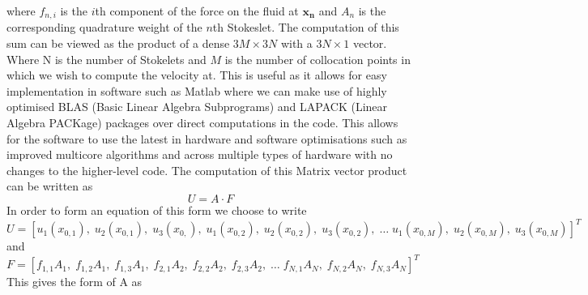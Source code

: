 where $f_{n, i}$ is the $i$th component of the force on the fluid at $\mathbf{x_n}$ and $A_n$ is the corresponding quadrature weight of the $n$th Stokeslet. The computation of this sum can be viewed as the product of a dense $3M \times 3N$ with a $3N \times 1$ vector. Where N is the number of Stokelets and $M$ is the number of collocation points in which we wish to compute the velocity at. This is useful as it allows for easy implementation in software such as Matlab where we can make use of highly optimised BLAS (Basic Linear Algebra Subprograms) and LAPACK (Linear Algebra PACKage) packages over direct computations in the code. This allows for the software to use the latest in hardware and software optimisations such as improved multicore algorithms and across multiple types of hardware with no changes to the higher-level code. 
The computation of this Matrix vector product can be written as 
\begin{equation}
\label{eq:matrixvectorproduct}
    U = A \cdot F
\end{equation}
In order to form an equation of this form we choose to write 
\small
\begin{equation*}
    U = [u_1(x_{0,1}), \; u_2(x_{0,1}), \; u_3(x_{0,}), \; u_1(x_{0,2}), \; u_2(x_{0,2}), \; u_3(x_{0,2}), \; \dots \; u_1(x_{0,M}), \; u_2(x_{0,M}), \; u_3(x_{0,M})]^{T}
\end{equation*}
\normalsize
and 
\small
\begin{equation*}
    F = [f_{1,1}A_1, \; f_{1,2}A_1, \; f_{1,3}A_1, \; f_{2,1}A_2, \; f_{2,2}A_2, \; f_{2,3}A_2, \; \dots \; f_{N,1}A_N, \; f_{N,2}A_N, \; f_{N,3}A_N]^{T}
\end{equation*}
\normalsize
This gives the form of A as 
\small

